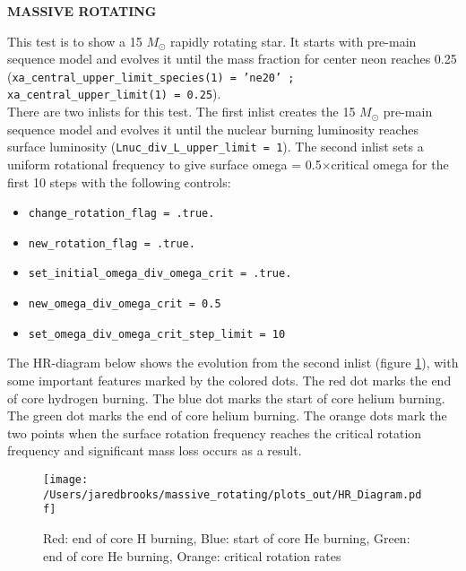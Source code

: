 \documentclass{article}
\begin{document}
	
	\begin{center}
	  \begin{Large}
	    \textbf{MASSIVE ROTATING}\\
	  \end{Large}
	\end{center}

        This test is to show a 15 $M_\odot$ rapidly rotating star.  It starts with pre-main sequence model and evolves it until the mass fraction for center neon reaches 0.25 (\texttt{xa\_central\_upper\_limit\_species(1) = 'ne20' ; xa\_central\_upper\_limit(1) = 0.25}).\\

        There are two inlists for this test.  The first inlist creates the 15 $M_\odot$ pre-main sequence model and evolves it until the nuclear burning luminosity reaches surface luminosity (\texttt{Lnuc\_div\_L\_upper\_limit = 1}).  The second inlist sets a uniform rotational frequency to give surface omega = 0.5$\times$critical omega for the first 10 steps with the following controls:
        \begin{itemize}
        \item \texttt{change\_rotation\_flag = .true.}
        \item \texttt{new\_rotation\_flag = .true.}
        \item \texttt{set\_initial\_omega\_div\_omega\_crit = .true.}
        \item \texttt{new\_omega\_div\_omega\_crit = 0.5}
        \item \texttt{set\_omega\_div\_omega\_crit\_step\_limit = 10}
        \end{itemize}

        The HR-diagram below shows the evolution from the second inlist (figure \ref{fig:1}), with some important features marked by the colored dots.  The red dot marks the end of core hydrogen burning.  The blue dot marks the start of core helium burning.  The green dot marks the end of core helium burning.  The orange dots mark the two points when the surface rotation frequency reaches the critical rotation frequency and significant mass loss occurs as a result.

        \begin{figure}[H]
          \centering
          \texttt{[image: /Users/jaredbrooks/massive\_rotating/plots\_out/HR\_Diagram.pdf]}
          \caption{Red: end of core H burning, Blue: start of core He burning, Green: end of core He burning, Orange: critical rotation rates}
          \label{fig:1}
        \end{figure}
\end{document}
